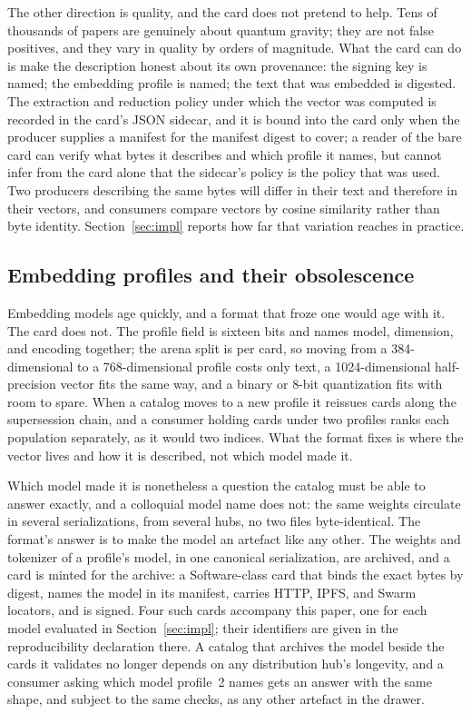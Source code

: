 \documentclass[11pt]{article}
\begin{document}
The other direction is quality, and the card does not pretend to help. Tens of
thousands of papers are genuinely about quantum gravity; they are not false
positives, and they vary in quality by orders of magnitude. What the card can
do is make the description honest about its own provenance: the signing key
is named; the embedding profile is named; the text that was embedded is
digested. The extraction and reduction policy under which the vector was
computed is recorded in the card's JSON sidecar, and it is bound into the
card only when the producer supplies a manifest for the manifest digest to
cover; a reader of the bare card can verify what bytes it describes and which
profile it names, but cannot infer from the card alone that the sidecar's
policy is the policy that was used. Two producers describing the same bytes
will differ in their text and therefore in their vectors, and consumers
compare vectors by cosine similarity rather than byte identity.
Section~\ref{sec:impl} reports how far that variation reaches in practice.

\subsection{Embedding profiles and their obsolescence}
\label{sec:profiles}

Embedding models age quickly, and a format that froze one would age with it.
The card does not. The profile field is sixteen bits and names model,
dimension, and encoding together; the arena split is per card, so moving from
a 384-dimensional to a 768-dimensional profile costs only text, a
1024-dimensional half-precision vector fits the same way, and a binary or
8-bit quantization fits with room to spare. When a catalog moves to a new
profile it reissues cards along the supersession chain, and a consumer
holding cards under two profiles ranks each population separately, as it
would two indices. What the format fixes is where the vector lives and how it
is described, not which model made it.

Which model made it is nonetheless a question the catalog must be able to
answer exactly, and a colloquial model name does not: the same weights
circulate in several serializations, from several hubs, no two files
byte-identical. The format's answer is to make the model an artefact like
any other. The weights and tokenizer of a profile's model, in one canonical
serialization, are archived, and a card is minted for the archive: a
Software-class card that binds the exact bytes by digest, names the model in
its manifest, carries HTTP, IPFS, and Swarm locators, and is signed. Four
such cards accompany this paper, one for each model evaluated in
Section~\ref{sec:impl}; their identifiers are given in the reproducibility
declaration there. A catalog that archives the model beside the cards it
validates no longer depends on any distribution hub's longevity, and a
consumer asking which model profile~2 names gets an answer with the same
shape, and subject to the same checks, as any other artefact in the drawer.
\end{document}
